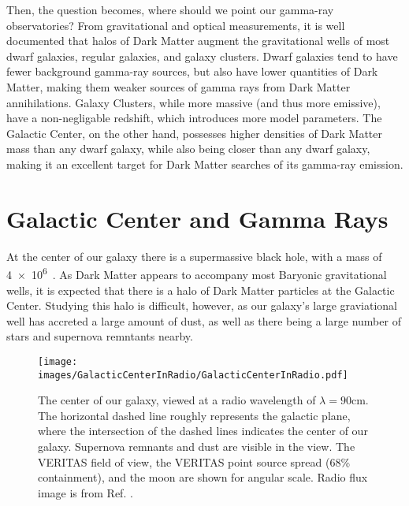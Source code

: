  Then, the question becomes, where should we point our gamma-ray observatories?
  From gravitational and optical measurements, it is well documented that halos of Dark Matter augment the gravitational wells of most dwarf galaxies, regular galaxies, and galaxy clusters.
  Dwarf galaxies tend to have fewer background gamma-ray sources, but also have lower quantities of Dark Matter, making them weaker sources of gamma rays from Dark Matter annihilations.
  Galaxy Clusters, while more massive (and thus more emissive), have a non-negligable redshift, which introduces more model parameters.
  The Galactic Center, on the other hand, possesses higher densities of Dark Matter mass than any dwarf galaxy, while also being closer than any dwarf galaxy, making it an excellent target for Dark Matter searches of its gamma-ray emission.


\section{Galactic Center and Gamma Rays}

  At the center of our galaxy there is a supermassive black hole, with a mass of \SI{4e6}{\Msol{}}~\cite{sgra_massdist}.
  As Dark Matter appears to accompany most Baryonic gravitational wells, it is expected that there is a halo of Dark Matter particles at the Galactic Center.
  Studying this halo is difficult, however, as our galaxy's large graviational well has accreted a large amount of dust, as well as there being a large number of stars and supernova remntants nearby.

  \begin{figure}[ht]
    \centering
    \texttt{[image: images/GalacticCenterInRadio/GalacticCenterInRadio.pdf]}
    \caption[Galactic Center in Radio]{
      The center of our galaxy, viewed at a radio wavelength of $\lambda=90\text{cm}$.
      The horizontal dashed line roughly represents the galactic plane, where the intersection of the dashed lines indicates the center of our galaxy.
      Supernova remnants and dust are visible in the view.
      The VERITAS field of view, the VERITAS point source spread (68\% containment), and the moon are shown for angular scale.
      Radio flux image is from Ref. \cite{galactic_center_in_radio}.}
    \label{fig_gc_radio}
  \end{figure}

